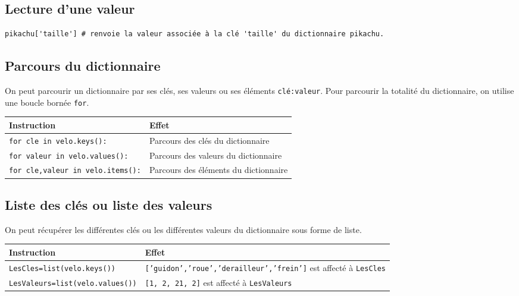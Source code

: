 \subsection*{Lecture d'une valeur}

\begin{lstlisting}
pikachu['taille'] # renvoie la valeur associée à la clé 'taille' du dictionnaire pikachu.
\end{lstlisting}

\subsection*{Parcours du dictionnaire}
On peut parcourir un dictionnaire par ses clés, ses valeurs ou ses éléments \lstinline{clé:valeur}. Pour parcourir la totalité du dictionnaire, on utilise une boucle bornée \lstinline{for}.

\begin{center}
\begin{tabular}{lp{7cm}}
\hline \textbf{Instruction} & \textbf{Effet} \\
\hline
\texttt{for cle in velo.keys():} & Parcours des clés du dictionnaire \\
\texttt {for valeur in velo.values():} & Parcours des valeurs du dictionnaire\\
\texttt {for cle,valeur in velo.items():} & Parcours des éléments du dictionnaire\\
\hline
\end{tabular}
\end{center}


\subsection*{Liste des clés ou liste des valeurs}
On peut récupérer les différentes clés ou les différentes valeurs du dictionnaire sous forme de liste.

\begin{center}
\begin{tabular}{lp{7cm}}
\hline \textbf{Instruction} & \textbf{Effet} \\
\hline
\texttt{LesCles=list(velo.keys())} & \texttt{['guidon','roue','derailleur','frein']} est affecté à \texttt{LesCles}\\

\texttt{LesValeurs=list(velo.values())} & \texttt{[1, 2, 21, 2]} est affecté à \texttt{LesValeurs}\\
\hline
\end{tabular}
\end{center}


